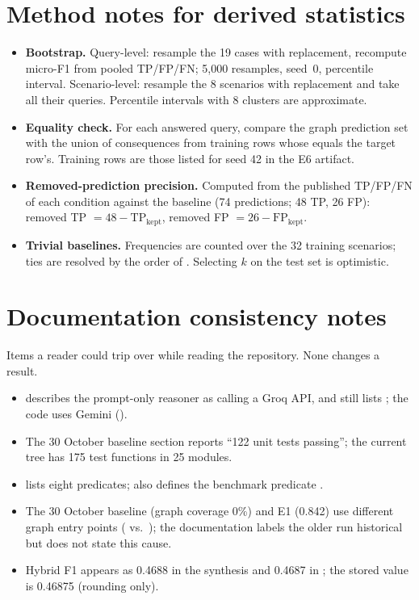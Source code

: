 \documentclass[10pt,twocolumn,a4paper]{extarticle}
\newcommand{\TP}{\mathrm{TP}}\newcommand{\FP}{\mathrm{FP}}\newcommand{\FN}{\mathrm{FN}}
\begin{document}
\section{Method notes for derived statistics}\label{app:method}
\begin{itemize}
  \item \textbf{Bootstrap.} Query-level: resample the 19 cases with replacement, recompute micro-F1 from pooled TP/FP/FN; 5{,}000 resamples, seed~0, percentile interval. Scenario-level: resample the 8 scenarios with replacement and take all their queries. Percentile intervals with 8 clusters are approximate.
  \item \textbf{Equality check.} For each answered query, compare the graph prediction set with the union of consequences from training rows whose  equals the target row's. Training rows are those listed for seed 42 in the E6 artifact.
  \item \textbf{Removed-prediction precision.} Computed from the published TP/FP/FN of each condition against the baseline (74 predictions; 48 TP, 26 FP): removed TP $=48-\TP_{\text{kept}}$, removed FP $=26-\FP_{\text{kept}}$.
  \item \textbf{Trivial baselines.} Frequencies are counted over the 32 training scenarios; ties are resolved by the order of . Selecting $k$ on the test set is optimistic.
\end{itemize}

\section{Documentation consistency notes}\label{app:drift}
Items a reader could trip over while reading the repository. None changes a result.
\begin{itemize}
  \item {} describes the prompt-only reasoner as calling a Groq API, and  still lists ; the code uses Gemini ().
  \item The 30 October baseline section reports ``122 unit tests passing''; the current tree has 175 test functions in 25 modules.
  \item {} lists eight predicates;  also defines the benchmark predicate .
  \item The 30 October baseline (graph coverage 0\%) and E1 (0.842) use different graph entry points ( vs.\ ); the documentation labels the older run historical but does not state this cause.
  \item Hybrid F1 appears as 0.4688 in the synthesis and 0.4687 in ; the stored value is 0.46875 (rounding only).
\end{itemize}
\end{document}
